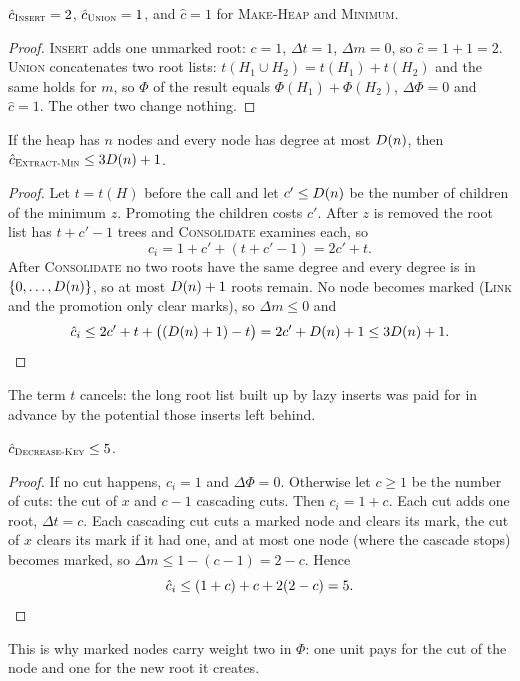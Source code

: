 \begin{lemma}\label{lem:insert}
\(\hat c_{\textsc{Insert}}=2\), \(\hat c_{\textsc{Union}}=1\), and \(\hat c=1\) for \textsc{Make-Heap} and \textsc{Minimum}.
\end{lemma}
\begin{proof}
\textsc{Insert} adds one unmarked root: \(c=1\), \(\Delta t=1\), \(\Delta m=0\), so \(\hat c=1+1=2\).
\textsc{Union} concatenates two root lists: \(t(H_1\cup H_2)=t(H_1)+t(H_2)\) and the same holds for \(m\), so
\(\Phi\) of the result equals \(\Phi(H_1)+\Phi(H_2)\), \(\Delta\Phi=0\) and \(\hat c=1\).
The other two change nothing.
\end{proof}

\begin{lemma}\label{lem:extract}
If the heap has \(n\) nodes and every node has degree at most \(D(n)\), then \(\hat c_{\textsc{Extract-Min}}\le 3D(n)+1\).
\end{lemma}
\begin{proof}
Let \(t=t(H)\) before the call and let \(c'\le D(n)\) be the number of children of the minimum \(z\). Promoting the
children costs \(c'\). After \(z\) is removed the root list has \(t+c'-1\) trees and \textsc{Consolidate} examines each,
so
\[c_i=1+c'+(t+c'-1)=2c'+t .\]
After \textsc{Consolidate} no two roots have the same degree and every degree is in \(\{0,\dots,D(n)\}\), so at most
\(D(n)+1\) roots remain. No node becomes marked (\textsc{Link} and the promotion only clear marks), so
\(\Delta m\le0\) and
\[\hat c_i\le 2c'+t+\big((D(n)+1)-t\big)=2c'+D(n)+1\le3D(n)+1. \qedhere\]
\end{proof}
The term \(t\) cancels: the long root list built up by lazy inserts was paid for in advance by the potential those
inserts left behind.

\begin{lemma}\label{lem:decrease}
\(\hat c_{\textsc{Decrease-Key}}\le5\).
\end{lemma}
\begin{proof}
If no cut happens, \(c_i=1\) and \(\Delta\Phi=0\). Otherwise let \(c\ge1\) be the number of cuts: the cut of \(x\)
and \(c-1\) cascading cuts. Then \(c_i=1+c\). Each cut adds one root, \(\Delta t=c\). Each cascading cut cuts a marked
node and clears its mark, the cut of \(x\) clears its mark if it had one, and at most one node (where the cascade
stops) becomes marked, so \(\Delta m\le 1-(c-1)=2-c\). Hence
\[\hat c_i\le(1+c)+c+2(2-c)=5. \qedhere\]
\end{proof}
This is why marked nodes carry weight two in \(\Phi\): one unit pays for the cut of the node and one for the
new root it creates.

